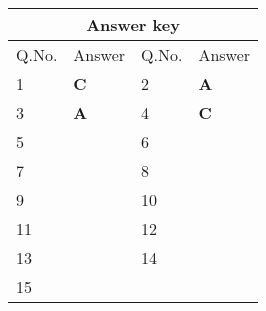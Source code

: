 \setlength\arrayrulewidth{1pt}
\begin{table}[H]
	\centering
	\begin{tabular}{|p{1.5cm}|p{1.5cm}||p{1.5cm}|p{1.5cm}|}
		\hline
		\multicolumn{4}{|c|}{\textbf{Answer key}}\\\hline\hline
		\rowcolor{ocrel}Q.No.&Answer&Q.No.&Answer\\\hline
		1&\textbf{C} &2&\textbf{A}\\\hline 
		3&\textbf{A} &4&\textbf{C} \\\hline
		5&\textbf{} &6&\textbf{} \\\hline
		7&\textbf{}&8&\textbf{}\\\hline
		9&\textbf{}&10&\textbf{}\\\hline
		11&\textbf{} &12&\textbf{}\\\hline
		13&\textbf{}&14&\textbf{}\\\hline
		15&\textbf{}& &\\\hline
		
	\end{tabular}
\end{table}